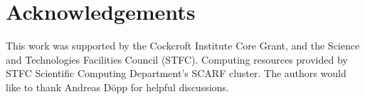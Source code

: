 \documentclass[preprint,5p,times,sort&compress]{elsarticle}
\begin{document}
\section*{Acknowledgements}

This work was supported by the Cockcroft Institute Core Grant, and the Science and Technologies Facilities Council (STFC). Computing resources provided by STFC Scientific Computing Department's SCARF cluster. The authors would like to thank Andreas D{\"o}pp for helpful discussions.



\end{document}
